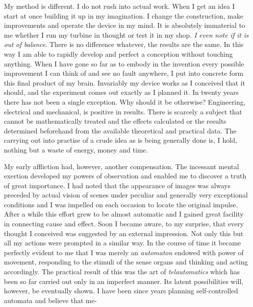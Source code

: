 \documentclass[a4paper,12pt,english,twoside,openright]{memoir}
\begin{document}
	My method is different.  I do not rush into actual work.  When I get an idea I start at once building 
	it up in my imagination.  I change the construction, make improvements and operate the device in 
	my mind.  It is absolutely immaterial to me whether I run my turbine in thought or test it in my 
	shop.  \emph{I even note if it is out of balance}.  There is no difference whatever, the results are the 
	same.  In this way I am able to rapidly develop and perfect a conception without touching 
	anything.  When I have gone so far as to embody in the invention every possible improvement I 
	can think of and see no fault anywhere, I put into concrete form this final product of my brain.  
	Invariably my device works as I conceived that it should, and the experiment comes out exactly 
	as I planned it.  In twenty years there has not been a single exception.  Why should it be 
	otherwise? Engineering, electrical and mechanical, is positive in results.  There is scarcely a 
	subject that cannot be mathematically treated and the effects calculated or the results determined 
	beforehand from the available theoretical and practical data.  The carrying out into practise of a 
	crude idea as is being generally done is, I hold, nothing but a waste of energy, money and time.  
	
	My early affliction had, however, another compensation.  The incessant mental exertion 
	developed my powers of observation and enabled me to discover a truth of great importance.  I 
	had noted that the appearance of images was always preceded by actual vision of scenes under 
	peculiar and generally very exceptional conditions and I was impelled on each occasion to locate 
	the original impulse.  After a while this effort grew to be almost automatic and I gained great 
	facility in connecting cause and effect.  Soon I became aware, to my surprise, that every thought I 
	conceived was suggested by an external impression.  Not only this but all my actions were 
	prompted in a similar way.  In the course of time it became perfectly evident to me that I was 
	merely an \emph{automaton} endowed with power of movement, responding to the stimuli of the sense 
	organs and thinking and acting accordingly.  The practical result of this was the art of 
	\emph{telautomatics} which has been so far carried out only in an imperfect manner.  Its latent 
	possibilities will, however, be eventually shown.  I have been since years planning self-controlled 
	automata and believe that me-
	
\end{document}
